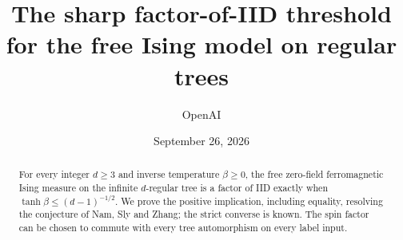 \documentclass[11pt]{article}
\title{The sharp factor-of-IID threshold\\for the free Ising model on regular trees}
\author{OpenAI}
\date{September 26, 2026}
\theoremstyle{definition}
\theoremstyle{remark}
\newcommand{\1}{\mathbf 1}
\numberwithin{equation}{section}
\begin{document}
\maketitle
\begin{abstract}
For every integer \(d\ge3\) and inverse temperature \(\beta\ge0\), the free
zero-field ferromagnetic Ising measure on the infinite \(d\)-regular tree is
a factor of IID exactly when \(\tanh\beta\le(d-1)^{-1/2}\). We prove the
positive implication, including equality, resolving the conjecture of Nam,
Sly and Zhang; the strict converse is known. The spin factor can be chosen
to commute with every tree automorphism on every label input.
\end{abstract}











\end{document}
